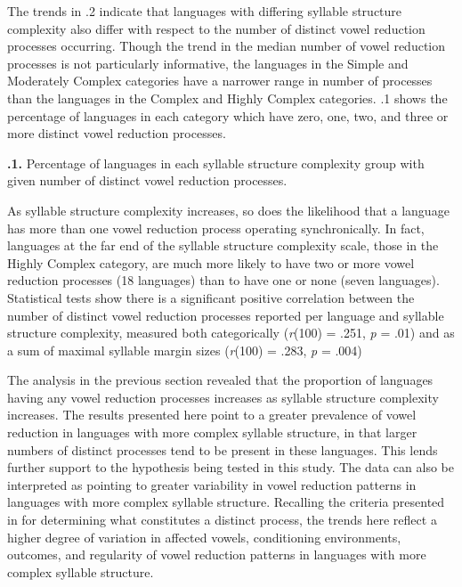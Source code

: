   The trends in .2 indicate that languages with differing syllable structure complexity also differ with respect to the number of distinct vowel reduction processes occurring. Though the trend in the median number of vowel reduction processes is not particularly informative, the languages in the Simple and Moderately Complex categories have a narrower range in number of processes than the languages in the Complex and Highly Complex categories. .1 shows the percentage of languages in each category which have zero, one, two, and three or more distinct vowel reduction processes.





\textbf{.1.} Percentage of languages in each syllable structure complexity group with given number of distinct vowel reduction processes.



  As syllable structure complexity increases, so does the likelihood that a language has more than one vowel reduction process operating synchronically. In fact, languages at the far end of the syllable structure complexity scale, those in the Highly Complex category, are much more likely to have two or more vowel reduction processes (18 languages) than to have one or none (seven languages). Statistical tests show there is a significant positive correlation between the number of distinct vowel reduction processes reported per language and syllable structure complexity, measured both categorically (\textit{r}(100) = .251, \textit{p} = .01) and as a sum of maximal syllable margin sizes (\textit{r}(100) = .283, \textit{p} = .004)



  The analysis in the previous section revealed that the proportion of languages having any vowel reduction processes increases as syllable structure complexity increases. The results presented here point to a greater prevalence of vowel reduction in languages with more complex syllable structure, in that larger numbers of distinct processes tend to be present in these languages. This lends further support to the hypothesis being tested in this study. The data can also be interpreted as pointing to greater variability in vowel reduction patterns in languages with more complex syllable structure. Recalling the criteria presented in  for determining what constitutes a distinct process, the trends here reflect a higher degree of variation in affected vowels, conditioning environments, outcomes, and regularity of vowel reduction patterns in languages with more complex syllable structure.



